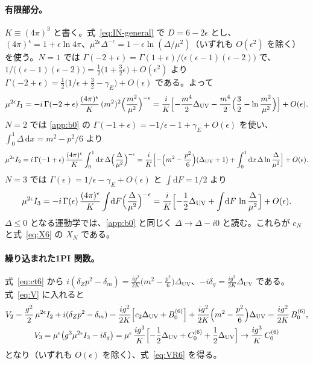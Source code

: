 \documentclass[a4paper,10pt]{ltjsarticle}
\newcommand{\dd}{\mathrm{d}}
\begin{document}
\paragraph{有限部分。}$K\equiv(4\pi)^3$ と書く。式~\eqref{eq:IN-general} で $D=6-2\epsilon$ とし、$(4\pi)^{\epsilon}=1+\epsilon\ln4\pi$、$\mu^{2\epsilon}\Delta^{-\epsilon}=1-\epsilon\ln(\Delta/\mu^2)$（いずれも $O(\epsilon^2)$ を除く）を使う。$N=1$ では $\Gamma(-2+\epsilon)=\Gamma(1+\epsilon)/\bigl(\epsilon(\epsilon-1)(\epsilon-2)\bigr)$ で、$1/\bigl((\epsilon-1)(\epsilon-2)\bigr)=\tfrac12\bigl(1+\tfrac32\epsilon\bigr)+O(\epsilon^2)$ より $\Gamma(-2+\epsilon)=\tfrac12\bigl(1/\epsilon+\tfrac32-\gamma_E\bigr)+O(\epsilon)$ である。よって
\begin{equation*}
\mu^{2\epsilon}I_1=-i\,\Gamma(-2+\epsilon)\,\frac{(4\pi)^\epsilon}{K}\,(m^2)^2\Bigl(\frac{m^2}{\mu^2}\Bigr)^{-\epsilon}
=\frac{i}{K}\Bigl[-\frac{m^4}{2}\Delta_{\mathrm{UV}}-\frac{m^4}{2}\Bigl(\frac32-\ln\frac{m^2}{\mu^2}\Bigr)\Bigr]+O(\epsilon).
\end{equation*}
$N=2$ では \ref{app:b0} の $\Gamma(-1+\epsilon)=-1/\epsilon-1+\gamma_E+O(\epsilon)$ を使い、$\int_0^1\Delta\,\dd x=m^2-p^2/6$ より
\begin{equation*}
\mu^{2\epsilon}I_2=i\,\Gamma(-1+\epsilon)\,\frac{(4\pi)^\epsilon}{K}\int_0^1\dd x\,\Delta\Bigl(\frac{\Delta}{\mu^2}\Bigr)^{-\epsilon}
=\frac{i}{K}\Bigl[-\Bigl(m^2-\frac{p^2}{6}\Bigr)(\Delta_{\mathrm{UV}}+1)+\int_0^1\dd x\,\Delta\ln\frac{\Delta}{\mu^2}\Bigr]+O(\epsilon).
\end{equation*}
$N=3$ では $\Gamma(\epsilon)=1/\epsilon-\gamma_E+O(\epsilon)$ と $\int\dd F=1/2$ より
\begin{equation*}
\mu^{2\epsilon}I_3=-i\,\Gamma(\epsilon)\,\frac{(4\pi)^\epsilon}{K}\int\!\dd F\Bigl(\frac{\Delta}{\mu^2}\Bigr)^{-\epsilon}
=\frac{i}{K}\Bigl[-\frac12\Delta_{\mathrm{UV}}+\int\!\dd F\,\ln\frac{\Delta}{\mu^2}\Bigr]+O(\epsilon).
\end{equation*}
$\Delta\le0$ となる運動学では、\ref{app:b0} と同じく $\Delta\to\Delta-i0$ と読む。これらが $c_N$ と式~\eqref{eq:X6} の $X_N$ である。

\paragraph{繰り込まれた1PI 関数。}式~\eqref{eq:ct6} から $i(\delta_Zp^2-\delta_m)=\frac{ig^2}{2K}\bigl(m^2-\frac{p^2}{6}\bigr)\Delta_{\mathrm{UV}}$、$-i\delta_g=\frac{ig^3}{2K}\Delta_{\mathrm{UV}}$ である。式~\eqref{eq:V} に入れると
\begin{gather*}
V_2=\frac{g^2}{2}\,\mu^{2\epsilon}I_2+i(\delta_Zp^2-\delta_m)=\frac{ig^2}{2K}\Bigl[c_2\Delta_{\mathrm{UV}}+B_0^{(6)}\Bigr]+\frac{ig^2}{2K}\Bigl(m^2-\frac{p^2}{6}\Bigr)\Delta_{\mathrm{UV}}=\frac{ig^2}{2K}\,B_0^{(6)},\\
V_3=\mu^{\epsilon}\bigl(g^3\mu^{2\epsilon}I_3-i\delta_g\bigr)=\mu^\epsilon\,\frac{ig^3}{K}\Bigl[-\frac12\Delta_{\mathrm{UV}}+C_0^{(6)}+\frac12\Delta_{\mathrm{UV}}\Bigr]\to\frac{ig^3}{K}\,C_0^{(6)}
\end{gather*}
となり（いずれも $O(\epsilon)$ を除く）、式~\eqref{eq:VR6} を得る。
\end{document}
